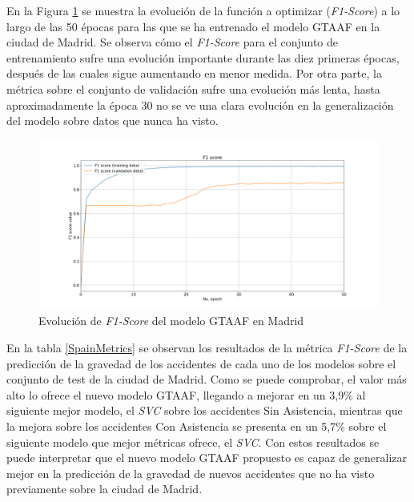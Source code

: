En la Figura \ref{MadridLossFunction} se muestra la evolución de la función a optimizar (\textit{F1-Score}) a lo largo de las 50 épocas para las que se ha entrenado el modelo GTAAF en la ciudad de Madrid. Se observa cómo el \textit{F1-Score} para el conjunto de entrenamiento sufre una evolución importante durante las diez primeras épocas, después de las cuales sigue aumentando en menor medida. Por otra parte, la métrica sobre el conjunto de validación sufre una evolución más lenta, hasta aproximadamente la época 30 no se ve una clara evolución en la generalización del modelo sobre datos que nunca ha visto.


\begin{figure}[h]
	\centering
	\includegraphics[width=14cm]{Figures/Madrid/madrid_convolution_2d_f1_score_2023-12-03-12 54 29.png}
	\caption{Evolución de \textit{F1-Score} del modelo GTAAF en Madrid}
	\label{MadridLossFunction}
\end{figure}

En la tabla \ref{SpainMetrics} se observan los resultados de la métrica \textit{F1-Score} de la predicción de la gravedad de los accidentes de cada uno de los modelos sobre el conjunto de test de la ciudad de Madrid. Como se puede comprobar, el valor más alto lo ofrece el nuevo modelo GTAAF, llegando a mejorar en un 3,9\% al siguiente mejor modelo, el \textit{SVC} sobre los accidentes Sin Asistencia, mientras que la mejora sobre los accidentes Con Asistencia se presenta en un 5,7\% sobre el siguiente modelo que mejor métricas ofrece, el \textit{SVC}. Con estos resultados se puede interpretar que el nuevo modelo GTAAF propuesto es capaz de generalizar mejor en la predicción de la gravedad de nuevos accidentes que no ha visto previamente sobre la ciudad de Madrid.

